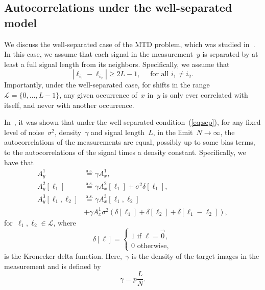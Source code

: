 \documentclass{article}
\begin{document}
\subsection{Autocorrelations under the well-separated model}
\label{subsec:relations}
We discuss the \mbox{well-separated} case of the MTD problem, which was studied in~\cite{bendory2019multi}. In this case, we assume that each signal in the measurement~$y$ is separated by at least a full signal length from its neighbors. Specifically, we assume that
\begin{equation}
\label{eq:sep}
|\ell_{i_1} - \ell_{i_2}| \ge 2L - 1, \quad \text{ for all } i_1 \ne i_2.
\end{equation}
Importantly, under the well-separated case, for shifts in the range \mbox{$\mathcal{L} = \{0, \ldots, {L - 1}\}$}, any given occurrence of~$x$ in~$y$ is only ever correlated with itself, and never with another occurrence.

In~\cite{bendory2019multi}, it was shown that under the well-separated condition~(\ref{eq:sep}), for any fixed level of noise~$\sigma^2$, density~$\gamma$ and signal length~$L$, in the limit~\mbox{$N \rightarrow \infty$}, the autocorrelations of the measurements are equal, possibly up to some bias terms, to the autocorrelations of the signal times a density constant. Specifically, we have that
\begin{align}
A_{y}^1 &\stackrel{\text{a.s.}}{=} \gamma A_{x}^1, \\
A_{y}^2 [\ell_1] &\stackrel{\text{a.s.}}{=} \gamma A_{x}^2 [\ell_1] + \sigma^2\delta[\ell_1], \\
A_{y}^3 [\ell_1, \ell_2] &\stackrel{\text{a.s.}}{=} \gamma A_{x}^3 [\ell_1, \ell_2] \nonumber \\&+ \gamma A_{x}^1 \sigma^2 (\delta[\ell_1] + \delta[\ell_2] + \delta[\ell_1 - \ell_2]),
\end{align}
for~$\ell_1, \ell_2 \in \mathcal{L}$, where
\begin{equation*}
\delta[\ell] = \begin{cases} 1 \text{ if } \ell = \vec{0}, \\ 0 \text{ otherwise}, \end{cases}
\end{equation*}
is the Kronecker delta function. Here,~$\gamma$ is the density of the target images in the measurement and is defined by
\begin{equation}
\gamma = p \frac{L}{N}.
\end{equation}
\end{document}
